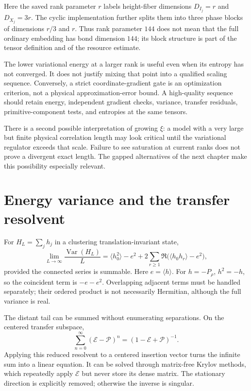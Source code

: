 Here the saved rank parameter $r$ labels height-fiber dimensions
$D_{I_j}=r$ and $D_{X_j}=3r$. The cyclic implementation further
splits them into three phase blocks of dimensions $r/3$ and $r$.
Thus rank parameter $144$ does not mean that the full ordinary
embedding has bond dimension $144$; its block structure is part
of the tensor definition and of the resource estimate.

The lower variational energy at a larger rank is useful even when its
entropy has not converged. It does not justify mixing that point into
a qualified scaling sequence. Conversely, a strict coordinate-gradient
gate is an optimization criterion, not a physical approximation-error
bound. A high-quality sequence should retain energy, independent
gradient checks, variance, transfer residuals, primitive-component
tests, and entropies at the same tensors.

There is a second possible interpretation of growing $\xi$: a model
with a very large but finite physical correlation length may look
critical until the variational regulator exceeds that scale. Failure
to see saturation at current ranks does not prove a divergent exact
length. The gapped alternatives of the next chapter make this
possibility especially relevant.

\section{Energy variance and the transfer resolvent}

For $H_L=\sum_jh_j$ in a clustering translation-invariant state,
\begin{equation}
 \lim_{L\to\infty}\frac{\operatorname{Var}(H_L)}L
 =\langle h_0^2\rangle-e^2
 +2\sum_{r\geq1}\Re\bigl(\langle h_0h_r\rangle-e^2\bigr),
 \label{eq:variance-density}
\end{equation}
provided the connected series is summable. Here $e=\langle h\rangle$.
For $h=-P_\rho$, $h^2=-h$, so the coincident term is $-e-e^2$.
Overlapping adjacent terms must be handled separately; their ordered
product is not necessarily Hermitian, although the full variance is
real.

The distant tail can be summed without enumerating separations. On
the centered transfer subspace,
\[
 \sum_{n=0}^{\infty}(\mathcal E-\mathcal P)^n
 =(1-\mathcal E+\mathcal P)^{-1}.
\]
Applying this reduced resolvent to a centered insertion vector turns
the infinite sum into a linear equation. It can be solved through
matrix-free Krylov methods, which repeatedly apply $\mathcal E$ but
never store its dense matrix. The stationary direction is explicitly
removed; otherwise the inverse is singular.

